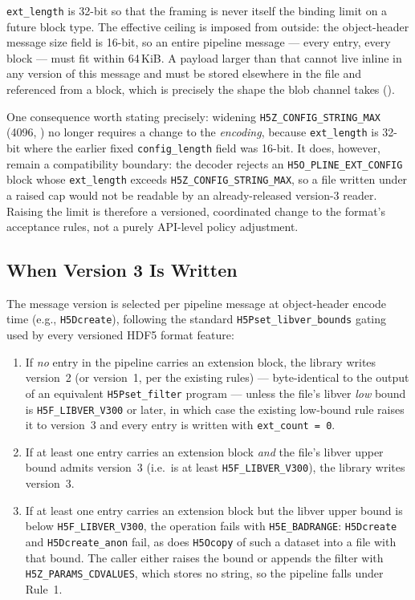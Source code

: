 \documentclass[../RFC-HDFG-2026-001.tex]{subfiles}
\begin{document}
\texttt{ext\_length} is 32-bit so that the framing is never itself the
binding limit on a future block type.  The effective ceiling is imposed
from outside: the object-header message size field is 16-bit, so an entire
pipeline message --- every entry, every block --- must fit within
64\,KiB.  A payload larger than that cannot live inline in any version of
this message and must be stored elsewhere in the file and referenced from
a block, which is precisely the shape the blob channel takes
().

One consequence worth stating precisely: widening
\texttt{H5Z\_CONFIG\_STRING\_MAX} (4096,
) no longer requires a change to the
\emph{encoding}, because \texttt{ext\_length} is 32-bit where the earlier
fixed \texttt{config\_length} field was 16-bit.  It does, however, remain a
compatibility boundary: the decoder rejects an
\texttt{H5O\_PLINE\_EXT\_CONFIG} block whose \texttt{ext\_length} exceeds
\texttt{H5Z\_CONFIG\_STRING\_MAX}, so a file written under a raised cap
would not be readable by an already-released version-3 reader.  Raising the
limit is therefore a versioned, coordinated change to the format's
acceptance rules, not a purely API-level policy adjustment.

\subsection{When Version 3 Is Written}
\label{sec:pline-v3-gating}

The message version is selected per pipeline message at object-header
encode time (e.g., \texttt{H5Dcreate}), following the standard
\texttt{H5Pset\_libver\_bounds} gating used by every versioned HDF5
format feature:

\begin{enumerate}
\item If \emph{no} entry in the pipeline carries an extension block, the
  library writes version~2 (or version~1, per the existing
  rules) --- byte-identical to the output of an equivalent
  \texttt{H5Pset\_filter} program --- unless the file's libver \emph{low}
  bound is \texttt{H5F\_LIBVER\_V300} or later, in which case the existing
  low-bound rule raises it to version~3 and every entry is written with
  \texttt{ext\_count = 0}.
\item If at least one entry carries an extension block \emph{and} the
  file's libver upper bound admits version~3 (i.e.\ is at least
  \texttt{H5F\_LIBVER\_V300}), the library writes version~3.
\item If at least one entry carries an extension block but the libver
  upper bound is below \texttt{H5F\_LIBVER\_V300}, the operation fails with
  \texttt{H5E\_BADRANGE}: \texttt{H5Dcreate} and \texttt{H5Dcreate\_anon}
  fail, as does \texttt{H5Ocopy} of such a dataset into a file with that
  bound.  The caller either raises the bound or appends the filter with
  \texttt{H5Z\_PARAMS\_CDVALUES}, which stores no string, so the pipeline
  falls under Rule~1.
\end{enumerate}
\end{document}

